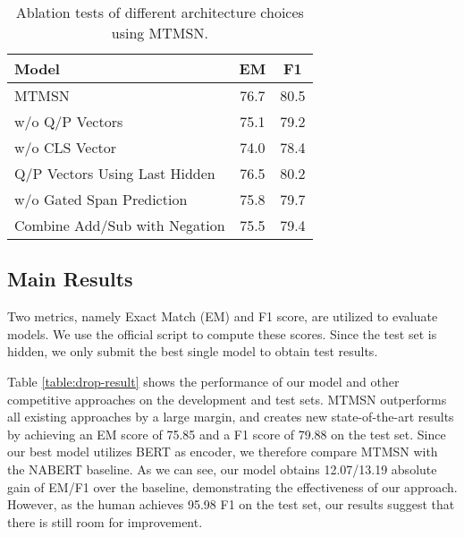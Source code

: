 \documentclass[11pt,a4paper]{article}
\newcommand\bertlarge{BERT\xspace}
\newcommand\nabertlarge{NABERT\xspace}
\newcommand\mtmsnlarge{MTMSN\xspace}
\begin{document}
\begin{table}
	\begin{center}
		\begin{tabular}{l|cc}
			\toprule
			Model & EM & F1 \\ 
			\midrule
			MTMSN                & 76.7 & 80.5  \\
			w/o Q/P Vectors            & 75.1 &  79.2 \\
			w/o CLS Vector              & 74.0 & 78.4  \\
			Q/P Vectors Using Last Hidden          & 76.5 & 80.2  \\
w/o Gated Span Prediction	     & 75.8 & 79.7  \\
			Combine Add/Sub with Negation  & 75.5 & 79.4  \\
			\bottomrule
		\end{tabular}
		\caption{\label{table:ablation2} Ablation tests of different architecture choices using \mtmsnlarge.}
	\end{center}
\end{table}

\subsection{Main Results}
Two metrics, namely Exact Match (EM) and F1 score, are utilized to evaluate models.
We use the official script to compute these scores. 
Since the test set is hidden, we only submit the best single model to obtain test results.

Table \ref{table:drop-result} shows the performance of our model and other competitive approaches on the development and test sets. 
MTMSN outperforms all existing approaches by a large margin, and creates new state-of-the-art results by achieving an EM score of 75.85 and a F1 score of 79.88 on the test set. 
Since our best model utilizes \bertlarge as encoder, we therefore compare \mtmsnlarge with the \nabertlarge baseline.
As we can see, our model obtains 12.07/13.19 absolute gain of EM/F1 over the baseline, demonstrating the effectiveness of our approach.
However, as the human achieves 95.98 F1 on the test set, our results suggest that there is still room for improvement.
\end{document}
